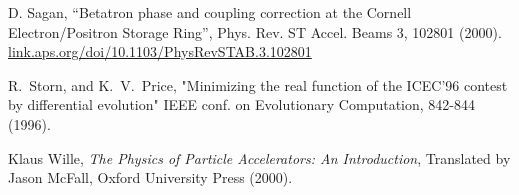 \begin{thebibliography}{99}
D. Sagan,
``Betatron phase and coupling correction at the Cornell Electron/Positron
Storage Ring'', Phys. Rev. ST Accel. Beams 3, 102801 (2000).
\hfill\break
\hspace*{20pt}
\url{link.aps.org/doi/10.1103/PhysRevSTAB.3.102801}

R.~Storn, and K.~V.~Price, "Minimizing the real function of the
ICEC'96 contest by differential evolution" IEEE conf. on Evolutionary
Computation, 842-844 (1996).

Klaus Wille, {\em The Physics of Particle Accelerators: An Introduction},
Translated by Jason McFall, Oxford University Press (2000).

\end{thebibliography}

